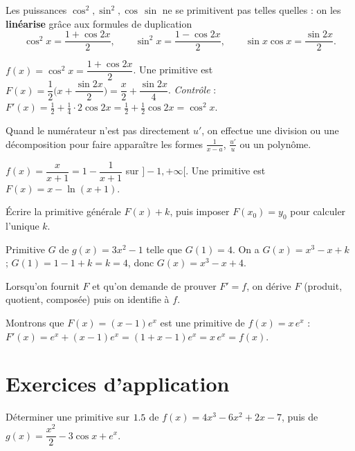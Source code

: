 Les puissances $\cos^{2},\sin^{2},\cos\,\sin$ ne se primitivent pas telles quelles : on les
\textbf{linéarise} grâce aux formules de duplication
\[
\cos^{2}x=\frac{1+\cos 2x}{2},\qquad
\sin^{2}x=\frac{1-\cos 2x}{2},\qquad
\sin x\cos x=\frac{\sin 2x}{2}.
\]
\begin{exemple}
$f(x)=\cos^{2}x=\dfrac{1+\cos 2x}{2}$. Une primitive est
$F(x)=\dfrac12\Big(x+\dfrac{\sin 2x}{2}\Big)=\dfrac x2+\dfrac{\sin 2x}{4}$.
\emph{Contrôle} : $F'(x)=\tfrac12+\tfrac14\cdot2\cos 2x=\tfrac12+\tfrac12\cos2x=\cos^{2}x$. \checkmark
\end{exemple}

Quand le numérateur n'est pas directement $u'$, on effectue une division ou une décomposition
pour faire apparaître les formes $\frac1{x-a}$, $\frac{u'}{u}$ ou un polynôme.
\begin{exemple}
$f(x)=\dfrac{x}{x+1}=1-\dfrac1{x+1}$ sur $]-1,+\infty[$. Une primitive est
$F(x)=x-\ln(x+1)$.
\end{exemple}

Écrire la primitive générale $F(x)+k$, puis imposer $F(x_0)=y_0$ pour calculer l'unique $k$.
\begin{exemple}
Primitive $G$ de $g(x)=3x^{2}-1$ telle que $G(1)=4$. On a $G(x)=x^{3}-x+k$ ;
$G(1)=1-1+k=k=4$, donc $G(x)=x^{3}-x+4$.
\end{exemple}

Lorsqu'on fournit $F$ et qu'on demande de prouver $F'=f$, on dérive $F$ (produit, quotient, composée)
puis on identifie à $f$.
\begin{exemple}
Montrons que $F(x)=(x-1)e^{x}$ est une primitive de $f(x)=x\,e^{x}$ :
$F'(x)=e^{x}+(x-1)e^{x}=(1+x-1)e^{x}=x\,e^{x}=f(x)$. \checkmark
\end{exemple}

\section{Exercices d'application}


\exo{} Déterminer une primitive sur $1.5$ de
$f(x)=4x^{3}-6x^{2}+2x-7$, puis de $g(x)=\dfrac{x^{2}}{2}-3\cos x+e^{x}$.

